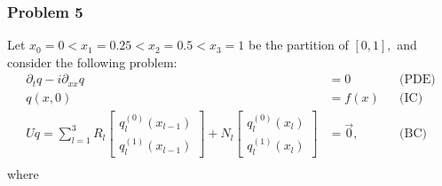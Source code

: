 \documentclass[11pt,reqno,oneside,a4paper]{article}
\theoremstyle{plain} %
\theoremstyle{definition}
\theoremstyle{remark}
\begin{document}
\subsubsection*{Problem 5}
Let $x_0 = 0 < x_1  = 0.25 < x_2 = 0.5 < x_3 = 1$ be the partition of $[0,1],$ and consider the following problem:
\begin{align*}
\partial_t q - i \partial_{xx} q &= 0 &&\text{(PDE)} \\
q(x, 0) &= f(x) &&\text{(IC)} \\
Uq = \sum^3_{l=1} R_l \begin{bmatrix} q_l^{(0)}(x_{l-1}) \\ q_l^{(1)}(x_{l-1}) \end{bmatrix} + N_l \begin{bmatrix} q_l^{(0)}(x_{l}) \\ q_l^{(1)}(x_{l}) \end{bmatrix} &= \vec{0}, &&\text{(BC)} \\
\end{align*}
where 
\end{document}
